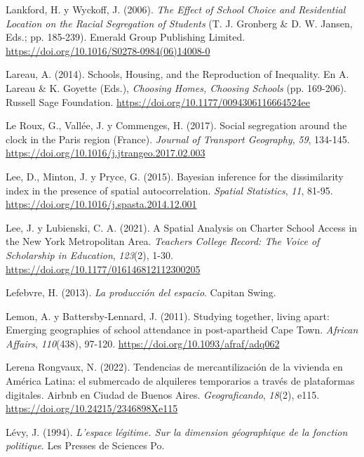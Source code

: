 \documentclass[
  spanish,
  a4paper,%
  chapterprefix=true,%
  DIV=calc,%
  twoside]{scrbook}%
\newlength{\cslhangindent}
\newenvironment{CSLReferences}[2] %
 {\begin{list}{}{%
  \setlength{\itemindent}{0pt}
  \setlength{\leftmargin}{0pt}
  \setlength{\parsep}{0pt}
  \ifodd #1
   \setlength{\leftmargin}{\cslhangindent}
   \setlength{\itemindent}{-1\cslhangindent}
  \fi
  \setlength{\itemsep}{#2\baselineskip}}}
 {\end{list}}
\begin{document}
\begin{CSLReferences}{1}{0}
Lankford, H. y Wyckoff, J. (2006). \emph{The Effect of School Choice and Residential Location on the Racial Segregation of Students} (T. J. Gronberg \& D. W. Jansen, Eds.; pp. 185-239). Emerald Group Publishing Limited. \url{https://doi.org/10.1016/S0278-0984(06)14008-0}

Lareau, A. (2014). Schools, {Housing}, and the {Reproduction} of {Inequality}. En A. Lareau \& K. Goyette (Eds.), \emph{Choosing {Homes}, {Choosing Schools}} (pp. 169-206). Russell Sage Foundation. \url{https://doi.org/10.1177/0094306116664524ee}

Le Roux, G., Vallée, J. y Commenges, H. (2017). Social segregation around the clock in the Paris region (France). \emph{Journal of Transport Geography}, \emph{59}, 134-145. \url{https://doi.org/10.1016/j.jtrangeo.2017.02.003}

Lee, D., Minton, J. y Pryce, G. (2015). Bayesian inference for the dissimilarity index in the presence of spatial autocorrelation. \emph{Spatial Statistics}, \emph{11}, 81-95. \url{https://doi.org/10.1016/j.spasta.2014.12.001}

Lee, J. y Lubienski, C. A. (2021). A Spatial Analysis on Charter School Access in the New York Metropolitan Area. \emph{Teachers College Record: The Voice of Scholarship in Education}, \emph{123}(2), 1-30. \url{https://doi.org/10.1177/016146812112300205}

Lefebvre, H. (2013). \emph{La producción del espacio}. Capitan Swing.

Lemon, A. y Battersby-Lennard, J. (2011). Studying together, living apart: Emerging geographies of school attendance in post-apartheid Cape Town. \emph{African Affairs}, \emph{110}(438), 97-120. \url{https://doi.org/10.1093/afraf/adq062}

Lerena Rongvaux, N. (2022). Tendencias de mercantilización de la vivienda en América Latina: el submercado de alquileres temporarios a través de plataformas digitales. Airbnb en Ciudad de Buenos Aires. \emph{Geograficando}, \emph{18}(2), e115. \url{https://doi.org/10.24215/2346898Xe115}

Lévy, J. (1994). \emph{L{'}espace légitime. Sur la dimension géographique de la fonction politique}. Les Presses de Sciences Po.


\end{CSLReferences}
\end{document}
